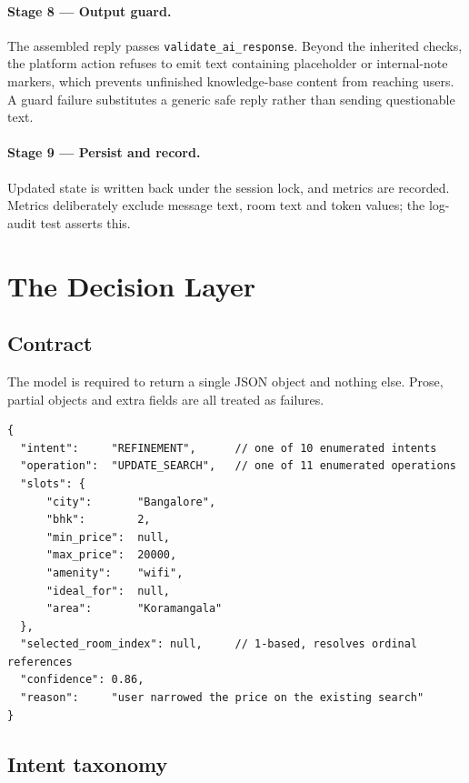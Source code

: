 \documentclass[11pt,a4paper]{article}
\newcommand{\fn}[1]{\texttt{\small #1}}
\begin{document}
\paragraph{Stage 8 --- Output guard.} The assembled reply passes
\fn{validate\_ai\_response}. Beyond the inherited checks, the platform action refuses to emit
text containing placeholder or internal-note markers, which prevents unfinished knowledge-base
content from reaching users. A guard failure substitutes a generic safe reply rather than
sending questionable text.

\paragraph{Stage 9 --- Persist and record.} Updated state is written back under the session
lock, and metrics are recorded. Metrics deliberately exclude message text, room text and
token values; the log-audit test asserts this.

\section{The Decision Layer}

\subsection{Contract}

The model is required to return a single JSON object and nothing else. Prose, partial objects
and extra fields are all treated as failures.

\begin{lstlisting}[caption={Shape of the decision object returned by the model}]
{
  "intent":     "REFINEMENT",      // one of 10 enumerated intents
  "operation":  "UPDATE_SEARCH",   // one of 11 enumerated operations
  "slots": {
      "city":       "Bangalore",
      "bhk":        2,
      "min_price":  null,
      "max_price":  20000,
      "amenity":    "wifi",
      "ideal_for":  null,
      "area":       "Koramangala"
  },
  "selected_room_index": null,     // 1-based, resolves ordinal references
  "confidence": 0.86,
  "reason":     "user narrowed the price on the existing search"
}
\end{lstlisting}

\subsection{Intent taxonomy}
\end{document}
